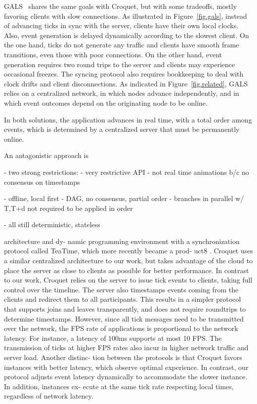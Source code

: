\documentclass[10pt,journal,compsoc]{IEEEtran}
\begin{document}
GALS~\cite{TODO} shares the same goals with Croquet, but with some tradeoffs,
mostly favoring clients with slow connections.
As illustrated in Figure~\ref{fig.gals}, instead of advancing ticks in sync
with the server, clients have their own local clocks.
Also, event generation is delayed dynamically according to the slowest client.
%
On the one hand, ticks do not generate any traffic and clients have smooth
frame transitions, even those with poor connections.
On the other hand, event generation requires two round trips to the server and
clients may experience occasional freezes.
The syncing protocol also requires bookkeeping to deal with clock drifts and
client disconnections.
%
As indicated in Figure~\ref{fig.related}, GALS relies on a centralized
network, in which nodes advance independently, and in which event outcomes
depend on the originating node to be online.

In both solutions, the application advances in real time, with a total order
among events, which is determined by a centralized server that must be
permanently online.

An antagonistic approach is

- two strong restrictions:
   - very restrictive API
   - not real time animations b/c no consensus on timestamps


- offline, local first
- DAG, no consensus, partial order
    - branches in parallel w/ T,T+d not required to be applied in order

- all still deterministic, stateless


architecture and dy-
namic programming environment with a synchronization
protocol called TeaTime, which more recently became a prod-
uct8 . Croquet uses a similar centralized architecture to our
work, but takes advantage of the cloud to place the server as
close to clients as possible for better performance. In contrast
to our work, Croquet relies on the server to issue tick events
to clients, taking full control over the timeline. The server
also timestamps events coming from the clients and redirect
them to all participants. This results in a simpler protocol
that supports joins and leaves transparently, and does not
require roundtrips to determine timestamps. However, since
all tick messages need to be transmitted over the network,
the FPS rate of applications is proportional to the network
latency. For instance, a latency of 100ms supports at most 10
FPS. The transmission of ticks at higher FPS rates also incur
in higher network traffic and server load. Another distinc-
tion between the protocols is that Croquet favors instances
with better latency, which observe optimal experience. In
contrast, our protocol adjusts event latency dynamically to
accommodate the slower instance. In addition, instances ex-
ecute at the same tick rate respecting local times, regardless
of network latency.
\end{document}
